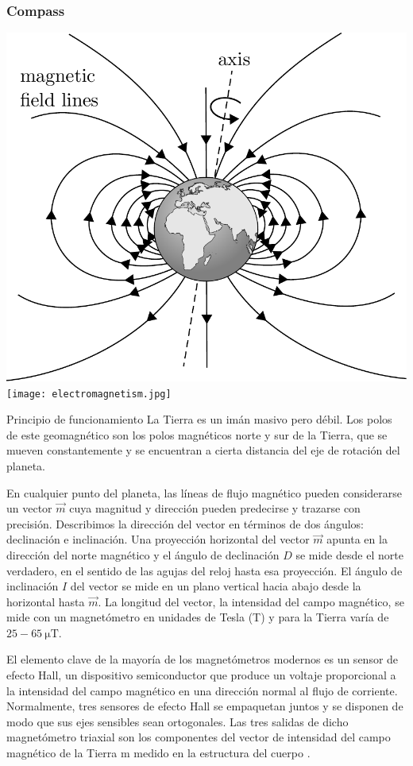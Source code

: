 \begin{frame}
    \frametitle{Compass}

        \includegraphics[width=0.4\columnwidth]{images/earth_magnetic_field.pdf}
        \texttt{[image: electromagnetism.jpg]}

    \begin{block}{Principio de funcionamiento}
        La Tierra es un imán masivo pero débil. Los polos de este geomagnético son los polos magnéticos norte y sur de la Tierra, que se mueven constantemente y se encuentran a cierta distancia del eje de rotación del planeta.
        
        En cualquier punto del planeta, las líneas de flujo magnético pueden considerarse un vector $\vec{m}$ cuya magnitud y dirección pueden predecirse y trazarse con precisión. Describimos la dirección del vector en términos de dos ángulos: declinación e inclinación. Una proyección horizontal del vector $\vec{m}$ apunta en la dirección del norte magnético y el ángulo de declinación $D$ se mide desde el norte verdadero, en el sentido de las agujas del reloj hasta esa proyección. El ángulo de inclinación $I$ del vector se mide en un plano vertical hacia abajo desde la horizontal hasta $\vec{m}$. La longitud del vector, la intensidad del campo magnético, se mide con un magnetómetro en unidades de Tesla (T) y para la Tierra varía de $25-\SI{65}{\micro\tesla}$.
        
        El elemento clave de la mayoría de los magnetómetros modernos es un sensor de efecto Hall, un dispositivo semiconductor que produce un voltaje proporcional a la intensidad del campo magnético en una dirección normal al flujo de corriente. Normalmente, tres sensores de efecto Hall se empaquetan juntos y se disponen de modo que sus ejes sensibles sean ortogonales. Las tres salidas de dicho magnetómetro triaxial son los componentes del vector de intensidad del campo magnético de la Tierra m medido en la estructura del cuerpo .

    \end{block}
\end{frame}

